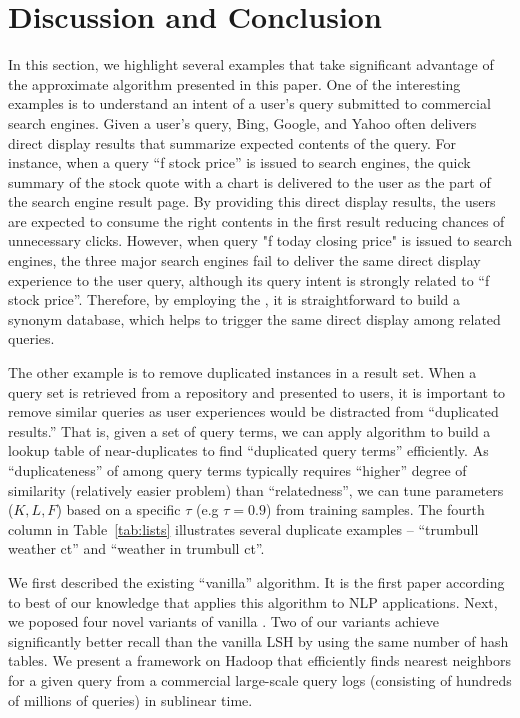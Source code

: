 \section{Discussion and Conclusion}
\label{sec:discuss}
In this section, we highlight several examples that take significant advantage of  the approximate \dflipb algorithm presented in this paper.
One of the interesting examples is to understand an intent of a user's query submitted to commercial search engines. Given a user's query,
Bing, Google, and Yahoo often delivers direct display results that summarize expected contents of the query. 
For instance, when a query ``f stock price'' is issued  to search engines, the quick summary of the stock quote with a chart is delivered 
to the user as the part of the search engine result page. By providing this direct display results, the users are expected to consume the right contents
in the first result reducing chances of unnecessary clicks. However, when query "f today closing price" is issued to search engines, the three major search engines 
fail to deliver the same direct display experience to the user query, although its query intent is strongly related to ``f stock price''. 
Therefore, by employing the \dflipb, it is straightforward to build a synonym database, which helps to trigger the same direct display among related queries.

The other example is to remove duplicated instances in a result set. 
When a query set is retrieved from a repository and presented to users, it is important to remove similar queries as user experiences would be distracted from ``duplicated results.'' 
That is, given a set of query terms, we can apply  \dflipb algorithm to build a lookup table of near-duplicates 
to find ``duplicated query terms'' efficiently. As ``duplicateness'' of among query terms typically requires ``higher'' degree of similarity (relatively easier problem) than ``relatedness'', we can tune parameters ($K, L, F$) based on a specific $\tau$ (e.g $\tau=0.9$) from training samples.  The fourth column in Table~\ref{tab:lists} illustrates several duplicate examples -- ``trumbull weather ct'' and ``weather in trumbull ct''.

We first described the existing ``vanilla'' \lsh algorithm. It is the first paper according to 
best of our knowledge that applies this algorithm to NLP applications. 
Next, we poposed four novel variants of vanilla \lsh. Two of our variants achieve 
significantly better recall than the vanilla LSH by using the same number of hash tables. 
We present a framework on Hadoop that efficiently finds nearest neighbors for a given query from a commercial large-scale query logs (consisting of hundreds of millions of queries) in sublinear time.
